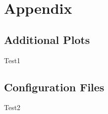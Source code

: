 \appendix
\chapter*{Appendix}
\renewcommand{\thesection}{\Alph{section}}

\section{Additional Plots}
Test1
\section{Configuration Files}
Test2

